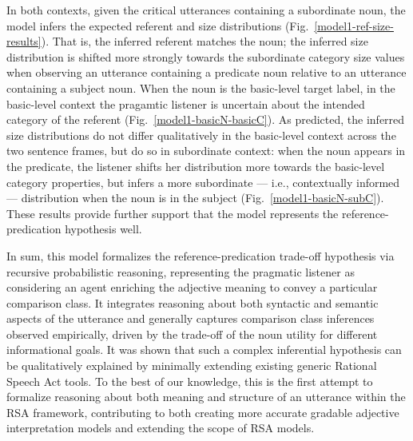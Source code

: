 In both contexts, given the critical utterances containing a subordinate noun, the model infers the expected referent and size distributions (Fig.~\ref{model1-ref-size-results}). That is, the inferred referent matches the noun; the inferred size distribution is shifted more strongly towards the subordinate category size values when observing an utterance containing a predicate noun relative to an utterance containing a subject noun. 
When the noun is the basic-level target label, in the basic-level context the pragamtic listener is uncertain about the intended category of the referent (Fig.~\ref{model1-basicN-basicC}). As predicted, the inferred size distributions do not differ qualitatively in the basic-level context across the two sentence frames, but do so in subordinate context: when the noun appears in the predicate, the listener shifts her distribution more towards the basic-level category properties, but infers a more subordinate --- i.e., contextually informed --- distribution when the noun is in the subject (Fig.~\ref{model1-basicN-subC}). These results provide further support that the model represents the reference-predication hypothesis well.

In sum, this model formalizes the reference-predication trade-off hypothesis via recursive probabilistic reasoning, representing the pragmatic listener as considering an agent enriching the adjective meaning to convey a particular comparison class. It integrates reasoning about both syntactic and semantic aspects of the utterance and generally captures comparison class inferences observed empirically, driven by the trade-off of the noun utility for different informational goals. It was shown that such a complex inferential hypothesis can be qualitatively explained by minimally extending existing generic Rational Speech Act tools. To the best of our knowledge, this is the first attempt to formalize reasoning about both meaning and structure of an utterance within the RSA framework,  contributing to both creating more accurate gradable adjective interpretation models and extending the scope of RSA models. 
